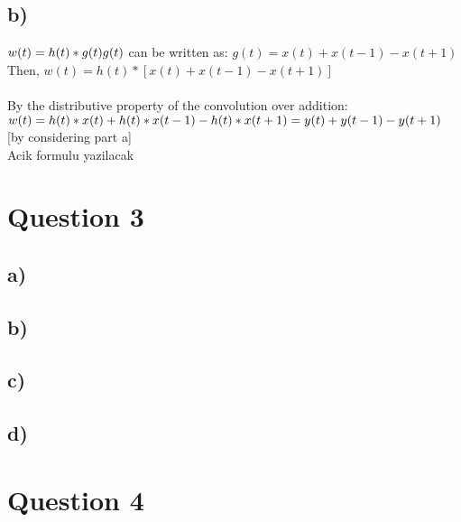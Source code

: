 \documentclass[12pt]{article}
\begin{document}
    \subsection*{b)} \begin{math}
    w(t) = h(t)*g(t) \\ 
    g(t)\end{math} can be written as: \begin{math} g(t) = x(t) + x(t-1) - x(t+1) \end{math} \\
    Then, \begin{math} w(t) = h(t)*[x(t) + x(t-1) - x(t+1)] \end{math} \\ \\
    By the distributive property of the convolution over addition: \\
    \begin{math} w(t) = h(t)*x(t) + h(t)*x(t-1) - h(t)*x(t+1)\\
    = y(t) + y(t-1) - y(t+1) \end{math} [by considering part a] \\
   Acik formulu yazilacak \\  
				   	 
    \section*{Question 3}
    \subsection*{a)}
    
    \subsection*{b)}

    \subsection*{c)}
  
    \subsection*{d)}
 
   
    \section*{Question 4}
\end{document}
